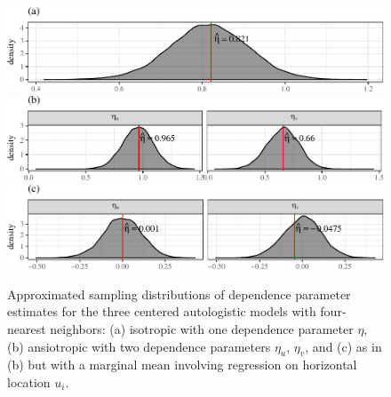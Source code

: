 \documentclass[12pt]{article}
\theoremstyle{definition}
\begin{document}
\begin{figure}
\includegraphics[width=1\linewidth]{supplement_files/figure-latex/endive-param-plot-1} \includegraphics[width=1\linewidth]{supplement_files/figure-latex/endive-param-plot-2} \includegraphics[width=1\linewidth]{supplement_files/figure-latex/endive-param-plot-3} \caption{Approximated sampling distributions of dependence parameter estimates  for the three centered autologistic models with four-nearest neighbors: (a)  isotropic  with one dependence parameter $\eta$, (b) ansiotropic with two dependence parameters $\eta_u$,  $\eta_v$, and (c) as in (b) but with a marginal mean involving regression on horizontal location $u_i$.}\label{fig:endive-param-plot}
\end{figure}
\end{document}
